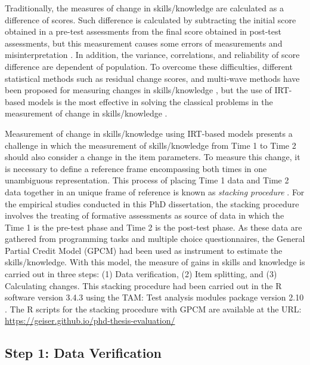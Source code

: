 Traditionally, the measures of change in skills/knowledge are calculated as a difference of scores. Such difference is calculated by subtracting the initial score obtained in a pre-test assessments from the final score obtained in post-test assessments, but this measurement causes some errors of measurements and misinterpretation \cite{Lord1956, Lord1958}. In addition, the variance, correlations, and reliability of score difference are dependent of population. To overcome these difficulties, different statistical methods such as residual change scores, and multi-wave methods have been proposed for measuring changes in skills/knowledge \cite{DimitrovRumrill2003, RogosaWillett1985}, but the use of IRT-based models is the most effective in solving the classical problems in the measurement of change in skills/knowledge \cite{GluckSpiel1997, QueirozPrimiCarvalhoEnumo2013}.

Measurement of change in skills/knowledge using IRT-based models presents a challenge in which the measurement of skills/knowledge from Time 1 to Time 2 should also consider a change in the item parameters. To measure this change, it is necessary to define a reference frame encompassing both times in one unambiguous representation. This process of placing Time 1 data and Time 2 data together in an unique frame of reference is known as \emph{stacking procedure} \cite{Wright2003}. For the empirical studies conducted in this PhD dissertation, the stacking procedure involves the treating of formative assessments as source of data in which the Time 1 is the pre-test phase and Time 2 is the post-test phase. As these data are gathered from programming tasks and multiple choice questionnaires, the General Partial Credit Model (GPCM) \cite{MastersWright1996} had been used as instrument to estimate the skills/knowledge. With this model, the measure of gains in skills and knowledge is carried out in three steps: (1) Data verification, (2) Item splitting, and (3) Calculating changes. This stacking procedure had been carried out in the R software version 3.4.3 \cite{RCoreTeam2017} using the TAM: Test analysis modules package version 2.10 \cite{RobitzschKieferWu2018}. The R scripts for the stacking procedure with GPCM are available at the URL: \url{https://geiser.github.io/phd-thesis-evaluation/}

\subsection{Step 1: Data Verification}

